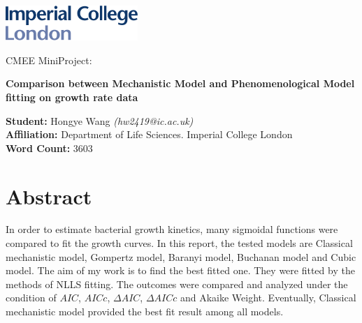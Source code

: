 \documentclass[11pt]{article}
\begin{document}
	\begin{titlepage}
		
		\includegraphics[width = 5cm]{../results/images/imperial.pdf}
		
		\begin{center}
			
		\vspace*{2cm}
		\LARGE
		CMEE MiniProject:
		
		\vspace*{3cm}
		\Huge
		\textbf{Comparison between Mechanistic Model and Phenomenological Model fitting on growth rate data}\\
		
		\vspace{5cm}
		\Large
		
		\textbf{Student:} Hongye Wang \textit{(hw2419@ic.ac.uk)}\\
		\vspace*{1cm}
		\textbf{Affiliation:} Department of Life Sciences. Imperial College London\\
		\vspace*{1cm}
		\textbf{Word Count:} 3603
		
		\vspace{2cm}
		
		\end{center}

	\end{titlepage}
	
\clearpage
\tableofcontents
	
	
\linenumbers
\doublespacing
\section{Abstract}
In order to estimate bacterial growth kinetics, many sigmoidal functions were compared to fit the growth curves. In this report, the tested models are Classical mechanistic model, Gompertz model, Baranyi model, Buchanan model and Cubic model. The aim of my work is to find the best fitted one. They were fitted by the methods of NLLS fitting. The outcomes were compared and analyzed under the condition of $AIC$, $AICc$, $\Delta$$AIC$, $\Delta$$AICc$ and Akaike Weight. Eventually, Classical mechanistic model provided the best fit result among all models. 
\end{document}
